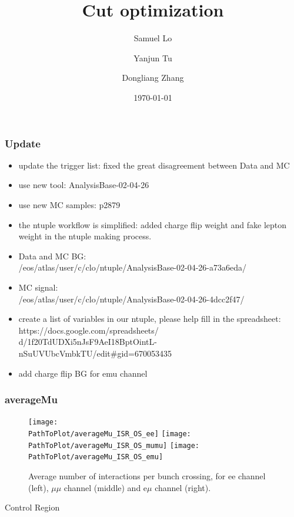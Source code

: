 \documentclass[mathserif,serif]{beamer}
\title{Cut optimization}
\author
{
Samuel Lo \inst{1}
\and
Yanjun Tu  \inst{1}
\and
Dongliang Zhang  \inst{2}
}
\institute
{
\inst{1}
The University of Hong Kong
\and
\inst{2}
University of Michigan
}
\date{\today}
\begin{document}
\frame{\titlepage}

\begin{frame}
\frametitle{Update}
\begin{itemize}
\small
\item update the trigger list: fixed the great disagreement between Data and MC
\item use new tool: AnalysisBase-02-04-26
\item use new MC samples: p2879
\item the ntuple workflow is simplified: added charge flip weight and fake lepton weight in the ntuple making process.
\item Data and MC BG: \\
/eos/atlas/user/c/clo/ntuple/AnalysisBase-02-04-26-a73a6eda/
\item MC signal: \\
/eos/atlas/user/c/clo/ntuple/AnalysisBase-02-04-26-4dcc2f47/
\item create a list of variables in our ntuple, please help fill in the spreadsheet: \\
\tiny
https://docs.google.com/spreadsheets/ \\
d/1f20TdUDXi5nJsF9AeI18BptOintL-nSuUVUbcVmbkTU/edit\#gid=670053435
\small
\item add charge flip BG for emu channel
\end{itemize}
\end{frame}

\def \PathToPlot {../plot}
\begin{frame}
\frametitle{averageMu}
\begin{figure}
\texttt{[image: \\PathToPlot/averageMu\_ISR\_OS\_ee]}
\texttt{[image: \\PathToPlot/averageMu\_ISR\_OS\_mumu]}
\texttt{[image: \\PathToPlot/averageMu\_ISR\_OS\_emu]} \\
\caption{Average number of interactions per bunch crossing, for ee channel (left), $\mu\mu$ channel (middle) and e$\mu$ channel (right).}
\end{figure}
\end{frame}

\begin{frame}
\begin{center}
\huge
Control Region
\end{center}
\end{frame}


\end{document}
